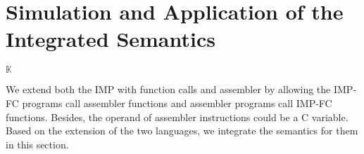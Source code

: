 \documentclass[letterpaper, 10 pt, conference]{IEEEtran}
\begin{document}
\section{Simulation and Application of the Integrated Semantics}
\par $\mathbb{K}$ \par We extend both the IMP with function calls and assembler by allowing the IMP-FC programs call assembler functions and assembler programs call IMP-FC functions. Besides, the operand of assembler instructions could be a C variable. Based on the extension of the two languages, we integrate the semantics for them in this section.
\end{document}
